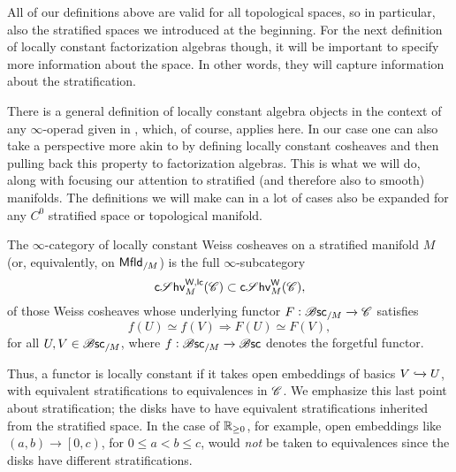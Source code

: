 \documentclass[../text]{subfiles}
\begin{document}
All of our definitions above are valid for all topological spaces, so in particular, also the stratified spaces we introduced at the beginning. For the next definition of locally constant factorization algebras though, it will be important to specify more information about the space. In other words, they will capture information about the stratification.

There is a general definition of locally constant algebra objects in the context of any $\infty$-operad given in \cite[def.2.3.3.20]{lurie_ha}, which, of course, applies here. In our case one can also take a perspective more akin to \cite[def.A.1.12]{lurie_ha} by defining locally constant cosheaves and then pulling back this property to factorization algebras. This is what we will do, along with focusing our attention to stratified (and therefore also to smooth) manifolds. The definitions we will make can in a lot of cases also be expanded for any $C^0$ stratified space or topological manifold.

\begin{definition}
    The $\infty$-category of locally constant Weiss cosheaves on a stratified manifold $M$ (or, equivalently, on $\mfld[r]_{/M}$) is the full $\infty$-subcategory
    \begin{equation}
        \csheaves[W, lc]_M (\catC) \subset \csheaves[W]_M (\catC),
    \end{equation}
    of those Weiss cosheaves whose underlying functor $F: \mathscr{B} \mathsf{sc}_{/M} \xrightarrow{} \mathscr{C}$ satisfies
    \begin{equation}
        f(U) \simeq f(V) \Rightarrow F(U) \simeq F(V),
    \end{equation}
    for all $U, V \in \mathscr{B} \mathsf{sc}_{/M}$, where $f: \mathscr{B} \mathsf{sc}_{/M} \xrightarrow{} \mathscr{B} \mathsf{sc}$ denotes the forgetful functor.
\end{definition}

\begin{remark}
    Thus, a functor is locally constant if it takes open embeddings of basics $V \xhookrightarrow{} U$, with equivalent stratifications to equivalences in $\mathscr{C}$. We emphasize this last point about stratification; the disks have to have equivalent stratifications inherited from the stratified space. In the case of $\mathbb{R}_{\geq 0}$, for example, open embeddings like $(a, b) \rightarrow \left[0, c\right)$, for $0 \leq a < b \leq c$, would \emph{not} be taken to equivalences since the disks have different stratifications.
\end{remark}
\end{document}
